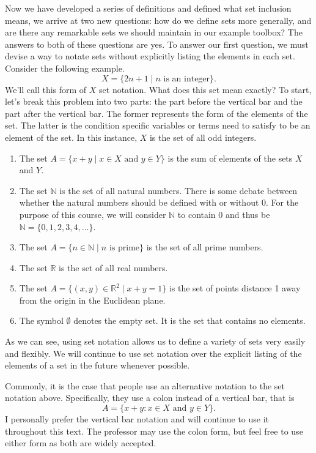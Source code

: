 \documentclass[12pt]{book}
\def\N{{\mathbb{N}}}
\def\R{{\mathbb{R}}}
\begin{document}
	Now we have developed a series of definitions and defined what set inclusion means, we arrive at two new questions: how do we define sets more generally, and are there any remarkable sets we should maintain in our example toolbox? The answers to both of these questions are yes. To answer our first question, we must devise a way to notate sets without explicitly listing the elements in each set. Consider the following example.
	\[X=\{2n+1\mid \text{$n$ is an integer}\}.\]
We'll call this form of $X$ set notation. What does this set mean exactly? To start, let's break this problem into two parts: the part before the vertical bar and the part after the vertical bar. The former represents the form of the elements of the set. The latter is the condition specific variables or terms need to satisfy to be an element of the set. In this instance, $X$ is the set of all odd integers. 
\begin{enumerate}
\item The set $A=\{x+y\mid x\in X\text{ and } y\in Y\}$ is the sum of elements of the sets $X$ and $Y$.
\item The set $\N$ is the set of all natural numbers. There is some debate between whether the natural numbers should be defined with or without 0. For the purpose of this course, we will consider $\N$ to contain 0 and thus be $\N=\{0,1,2,3,4,...\}$.
\item The set $A=\{n\in\N\mid n\text{ is prime}\}$ is the set of all prime numbers.
\item The set $\R$ is the set of all real numbers.
\item The set $A=\{(x,y)\in\R^2\mid x+y=1\}$ is the set of points distance 1 away from the origin in the Euclidean plane.
\item The symbol $\emptyset$ denotes the empty set. It is the set that contains no elements.
\end{enumerate}

As we can see, using set notation allows us to define a variety of sets very easily and flexibly. We will continue to use set notation over the explicit listing of the elements of a set in the future whenever possible.

Commonly, it is the case that people use an alternative notation to the set notation above. Specifically, they use a colon instead of a vertical bar, that is
\[A=\{x+y\colon x\in X\text{ and } y\in Y\}.\]
I personally prefer the vertical bar notation and will continue to use it throughout this text. The professor may use the colon form, but feel free to use either form as both are widely accepted.\\
\end{document}

